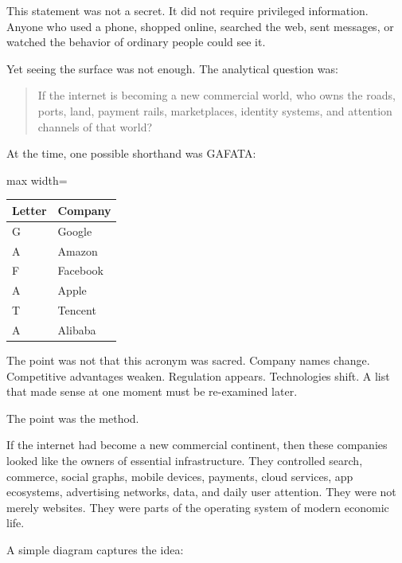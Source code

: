 This statement was not a secret. It did not require privileged information. Anyone who used a phone, shopped online, searched the web, sent messages, or watched the behavior of ordinary people could see it.

Yet seeing the surface was not enough. The analytical question was:

\begin{quote}
If the internet is becoming a new commercial world, who owns the roads, ports, land, payment rails, marketplaces, identity systems, and attention channels of that world?
\end{quote}

At the time, one possible shorthand was GAFATA:

\begin{center}
\begin{adjustbox}{max width=\linewidth}
\begin{tabular}{ll}
\hline
Letter & Company \\
\hline
G & Google \\
A & Amazon \\
F & Facebook \\
A & Apple \\
T & Tencent \\
A & Alibaba \\
\hline
\end{tabular}
\end{adjustbox}
\end{center}

The point was not that this acronym was sacred. Company names change. Competitive advantages weaken. Regulation appears. Technologies shift. A list that made sense at one moment must be re-examined later.

The point was the method.

If the internet had become a new commercial continent, then these companies looked like the owners of essential infrastructure. They controlled search, commerce, social graphs, mobile devices, payments, cloud services, app ecosystems, advertising networks, data, and daily user attention. They were not merely websites. They were parts of the operating system of modern economic life.

A simple diagram captures the idea:

